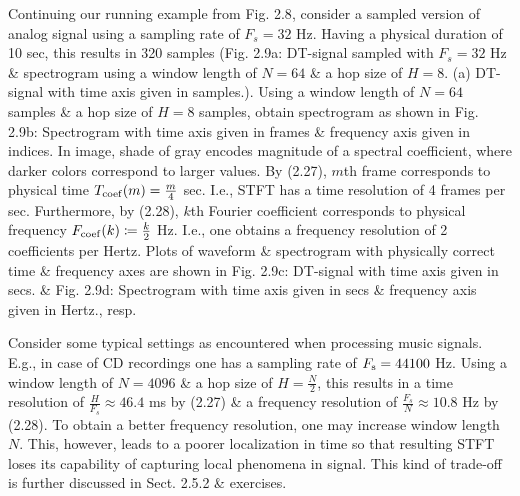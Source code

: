 \documentclass{article}
\begin{document}
\begin{itemize}
\begin{itemize}
\begin{itemize}
			Continuing our running example from {\sf Fig. 2.8}, consider a sampled version of analog signal using a sampling rate of $F_s = 32$ Hz. Having a physical duration of 10 sec, this results in 320 samples ({\sf Fig. 2.9a: DT-signal sampled with $F_s = 32$ Hz \& spectrogram using a window length of $N = 64$ \& a hop size of $H = 8$. (a) DT-signal with time axis given in samples.}). Using a window length of $N = 64$ samples \& a hop size of $H = 8$ samples, obtain spectrogram as shown in {\sf Fig. 2.9b: Spectrogram with time axis given in frames \& frequency axis given in indices.} In image, shade of gray encodes magnitude of a spectral coefficient, where darker colors correspond to larger values. By (2.27), $m$th frame corresponds to physical time $T_{\rm coef}(m) = \frac{m}{4}$ sec. I.e., STFT has a time resolution of 4 frames per sec. Furthermore, by (2.28), $k$th Fourier coefficient corresponds to physical frequency $F_{\rm coef}(k)\coloneqq\frac{k}{2}$ Hz. I.e., one obtains a frequency resolution of 2 coefficients per Hertz. Plots of waveform \& spectrogram with physically correct time \& frequency axes are shown in {\sf Fig. 2.9c: DT-signal with time axis given in secs.} \& {\sf Fig. 2.9d: Spectrogram with time axis given in secs \& frequency axis given in Hertz.}, resp.
			
			Consider some typical settings as encountered when processing music signals. E.g., in case of CD recordings one has a sampling rate of $F_{\rm s} = 44100$ Hz. Using a window length of $N = 4096$ \& a hop size of $H = \frac{N}{2}$, this results in a time resolution of $\frac{H}{F_s}\approx46.4$ ms by (2.27) \& a frequency resolution of $\frac{F_s}{N}\approx10.8$ Hz by (2.28). To obtain a better frequency resolution, one may increase window length $N$. This, however, leads to a poorer localization in time so that resulting STFT loses its capability of capturing local phenomena in signal. This kind of trade-off is further discussed in Sect. 2.5.2 \& exercises.
			

\end{itemize}
\end{itemize}
\end{itemize}
\end{document}
